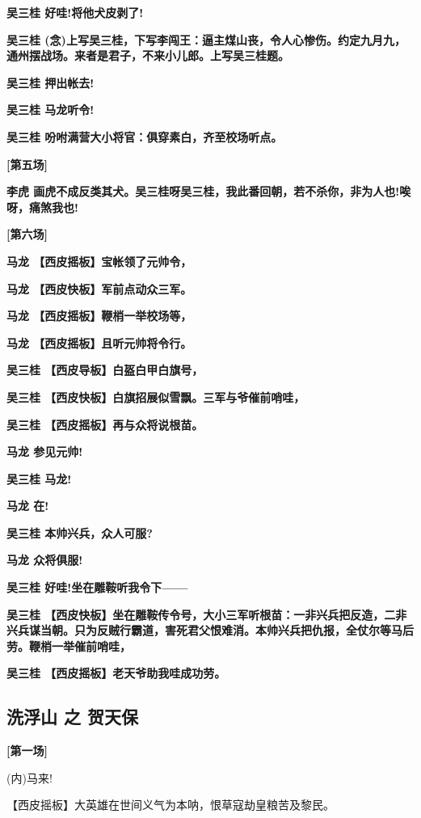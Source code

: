 \textbf{吴三桂 好哇!将他犬皮剥了!}

\textbf{吴三桂
(念)上写吴三桂，下写李闯王：逼主煤山丧，令人心惨伤。约定九月九，通州摆战场。来者是君子，不来小儿郎。上写吴三桂题。}

\textbf{吴三桂 押出帐去!}

\textbf{吴三桂 马龙听令!}

\textbf{吴三桂 吩咐满营大小将官：俱穿素白，齐至校场听点。}

\textbf{{[}第五场{]}}

\textbf{李虎
画虎不成反类其犬。吴三桂呀吴三桂，我此番回朝，若不杀你，非为人也!唉呀，痛煞我也!}

\textbf{{[}第六场{]}}

\textbf{马龙 【西皮摇板】宝帐领了元帅令，}

\textbf{马龙 【西皮快板】军前点动众三军。}

\textbf{马龙 【西皮摇板】鞭梢一举校场等，}

\textbf{马龙 【西皮摇板】且听元帅将令行。}

\textbf{吴三桂 【西皮导板】白盔白甲白旗号，}

\textbf{吴三桂 【西皮快板】白旗招展似雪飘。三军与爷催前哨哇，}

\textbf{吴三桂 【西皮摇板】再与众将说根苗。}

\textbf{马龙 参见元帅!}

\textbf{吴三桂 马龙!}

\textbf{马龙 在!}

\textbf{吴三桂 本帅兴兵，众人可服?}

\textbf{马龙 众将俱服!}

\textbf{吴三桂 好哇!坐在雕鞍听我令下------}

\textbf{吴三桂
【西皮快板】坐在雕鞍传令号，大小三军听根苗：一非兴兵把反造，二非兴兵谋当朝。只为反贼行霸道，害死君父恨难消。本帅兴兵把仇报，全仗尔等马后劳。鞭梢一举催前哨哇，}

\textbf{吴三桂 【西皮摇板】老天爷助我哇成功劳。}

\hypertarget{ux6d17ux6d6eux5c71-ux4e4b-ux8d3aux5929ux4fdd}{%
\subsection{洗浮山 之
贺天保}\label{ux6d17ux6d6eux5c71-ux4e4b-ux8d3aux5929ux4fdd}}

\textbf{{[}第一场{]}}

(内)马来!

【西皮摇板】大英雄在世间义气为本呐，恨草寇劫皇粮苦及黎民。

